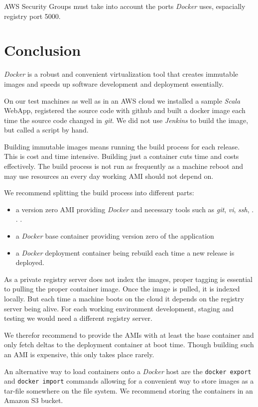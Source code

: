 \documentclass[captions=tableheading]{article}
\begin{document}
AWS Security Groups must take into account the ports \emph{Docker} uses, espacially registry port 5000.
\section{Conclusion}
\label{sec-9}

\emph{Docker} is a robust and convenient virtualization tool that creates immutable images and speeds up software development and deployment essentially.  

On our test machines as well as in an AWS cloud we installed a sample \emph{Scala} WebApp, registered the source code with github and built a docker image each time the source code changed in \emph{git}. We did not use \emph{Jenkins} to build the image, but called a script by hand. 

Building immutable images means running the build process for each release. This is cost and time intensive. Building just a container cuts time and costs effectively. The build process is not run as frequently as a machine reboot and may use resources an every day working AMI should not depend on. 

We recommend splitting the build process into different parts:
\begin{itemize}
\item a version zero AMI providing \emph{Docker} and necessary tools such as \emph{git}, \emph{vi}, \emph{ssh}, . . .
\item a \emph{Docker} base container providing version zero of  the application
\item a \emph{Docker} deployment container being rebuild each time a new release is deployed.
\end{itemize}

As a private registry server does not index the images, proper tagging is essential to pulling the proper container image. Once the image is pulled, it is indexed locally. But each time a machine boots on the cloud it depends on the registry server being alive. For each working environment development, staging and testing we would need a different registry server. 

We therefor recommend to provide the AMIs with at least the base container and only fetch deltas to the deployment container at boot time. Though building such an AMI is expensive, this only takes place rarely.

An alternative way to load containers onto a \emph{Docker} host are the \texttt{docker export} and \texttt{docker import} commands allowing for a convenient way to store images as a tar-file somewhere on the file system. We recommend storing the containers in an Amazon S3 bucket.
\end{document}
